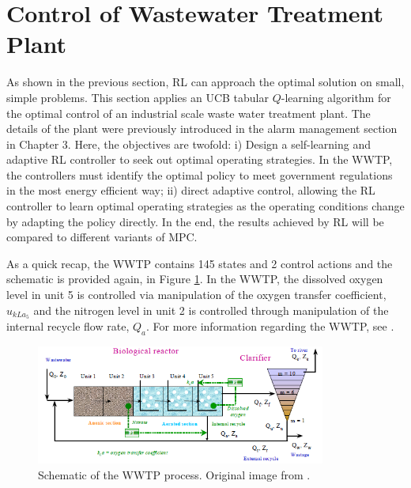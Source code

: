 \section{Control of Wastewater Treatment Plant}
As shown in the previous section, RL can approach the optimal solution on small, simple problems.  This section applies an UCB tabular $Q$-learning algorithm for the optimal control of an industrial scale waste water treatment plant.  The details of the plant were previously introduced in the alarm management section in Chapter 3.  Here, the objectives are twofold: i) Design a self-learning and adaptive RL controller to seek out optimal operating strategies. In the WWTP, the controllers must identify the optimal policy to meet government regulations in the most energy efficient way; ii) direct adaptive control, allowing the RL controller to learn optimal operating strategies as the operating conditions change by adapting the policy directly. In the end, the results achieved by RL will be compared to different variants of MPC.

As a quick recap, the WWTP contains 145 states and 2 control actions and the schematic is provided again, in Figure \ref{fig:04WWTP}. In the WWTP, the dissolved oxygen level in unit 5 is controlled via manipulation of the oxygen transfer coefficient, $u_{kLa_5}$ and the nitrogen level in unit 2 is controlled through manipulation of the internal recycle flow rate, $Q_a$.  For more information regarding the WWTP, see \cite{wwtp}.

\begin{figure}[H]
    \centering
    \includegraphics[width=0.85\textwidth]{images/ch3/WWTP.png}
    \caption{Schematic of the WWTP process. Original image from \cite{wwtp}.}
    \label{fig:04WWTP}
\end{figure}

